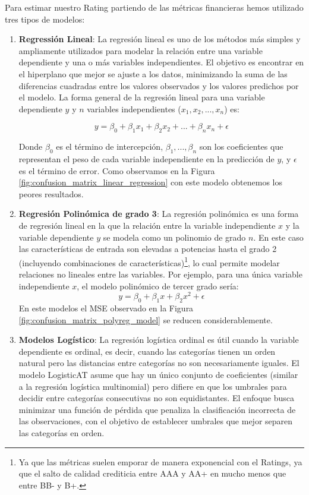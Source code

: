 \documentclass{article}
\begin{document}
Para estimar nuestro Rating partiendo de las métricas financieras hemos utilizado tres tipos de modelos:
\begin{enumerate}
    \item \textbf{Regressión Lineal}: La regresión lineal es uno de los métodos más simples y ampliamente utilizados para modelar la relación entre una variable dependiente y una o más variables independientes. El objetivo es encontrar en el hiperplano que mejor se ajuste a los datos, minimizando la suma de las diferencias cuadradas entre los valores observados y los valores predichos por el modelo. La forma general de la regresión lineal para una variable dependiente \(y\) y \(n\) variables independientes (\(x_1, x_2, ..., x_n\)) es:
    
\[ y = \beta_0 + \beta_1x_1 + \beta_2x_2 + ... + \beta_nx_n + \epsilon \]

Donde \(\beta_0\) es el término de intercepción, \(\beta_1, ..., \beta_n\) son los coeficientes que representan el peso de cada variable independiente en la predicción de \(y\), y \(\epsilon\) es el término de error. Como observamos en la Figura \ref{fig:confusion_matrix_linear_regression} con este modelo obtenemos los peores resultados.

\item \textbf{Regresión Polinómica de grado 3}: La regresión polinómica es una forma de regresión lineal en la que la relación entre la variable independiente \(x\) y la variable dependiente \(y\) se modela como un polinomio de grado \(n\). En este caso las características de entrada son elevadas a potencias hasta el grado 2 (incluyendo combinaciones de características)\footnote{Ya que las métricas suelen emporar de manera exponencial con el Ratings, ya que el salto de calidad crediticia entre AAA y AA+ en mucho menos que entre BB- y B+.}, lo cual permite modelar relaciones no lineales entre las variables. Por ejemplo, para una única variable independiente \(x\), el modelo polinómico de tercer grado sería:
\[ y = \beta_0 + \beta_1x + \beta_2x^2 + \epsilon \]
En este modelos el MSE observado en la Figura \ref{fig:confusion_matrix_polyreg_model} se reducen considerablemente.
\item \textbf{Modelos Logístico}: La regresión logística ordinal es útil cuando la variable dependiente es ordinal, es decir, cuando las categorías tienen un orden natural pero las distancias entre categorías no son necesariamente iguales. El modelo LogisticAT asume que hay un único conjunto de coeficientes (similar a la regresión logística multinomial) pero difiere en que los umbrales para decidir entre categorías consecutivas no son equidistantes. El enfoque busca minimizar una función de pérdida que penaliza la clasificación incorrecta de las observaciones, con el objetivo de establecer umbrales que mejor separen las categorías en orden.
\end{enumerate}
\end{document}
